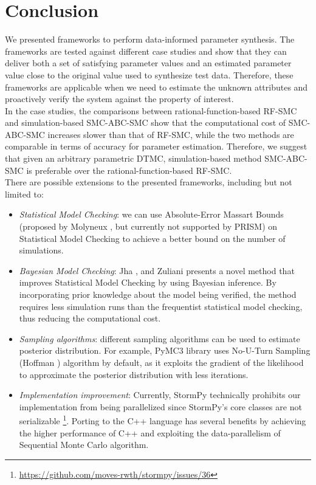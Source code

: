 \chapter{Conclusion}
We presented frameworks to perform data-informed parameter synthesis. The frameworks are tested
against different case studies and show that they can deliver both a set of satisfying parameter
values and an estimated parameter value close to the original value used to synthesize test data.
Therefore, these frameworks are applicable when we need to estimate the unknown attributes and
proactively verify the system against the property of interest.\\
In the case studies, the comparisons between rational-function-based RF-SMC and simulation-based
SMC-ABC-SMC show that the computational cost of SMC-ABC-SMC increases slower than that of RF-SMC,
while the two methods are comparable in terms of accuracy for parameter estimation. Therefore, we
suggest that given an arbitrary parametric DTMC, simulation-based method SMC-ABC-SMC is preferable
over the rational-function-based RF-SMC.\\
There are possible extensions to the presented frameworks, including but not limited to:
\begin{itemize}
      \item \textit{Statistical Model Checking}: we can use Absolute-Error Massart Bounds (proposed
            by Molyneux \cite{molyneux2020abc}, but currently not supported by PRISM) on Statistical
            Model Checking to achieve a better bound on the number of simulations.
      \item \textit{Bayesian Model Checking}: Jha \cite{jha2009bayesian}, and Zuliani
            \cite{zuliani2013bayesian} presents a novel method that improves Statistical Model
            Checking by using Bayesian inference. By incorporating prior knowledge about the model
            being verified, the method requires less simulation runs than the frequentist
            statistical model checking, thus reducing the computational cost.
      \item \textit{Sampling algorithms}: different sampling algorithms can be used to estimate
            posterior distribution. For example, PyMC3 library \cite{salvatier2016pymc3} uses
            No-U-Turn Sampling (Hoffman \cite{hoffman2014no}) algorithm by default, as it exploits
            the gradient of the likelihood to approximate the posterior distribution with less
            iterations.
      \item \textit{Implementation improvement}: Currently, StormPy technically prohibits our
            implementation from being parallelized since StormPy's core classes are not serializable
            \footnote{\url{https://github.com/moves-rwth/stormpy/issues/36}}. Porting to the C++
            language has several benefits by achieving the higher performance of C++ and exploiting the
            data-parallelism of Sequential Monte Carlo algorithm.
\end{itemize}